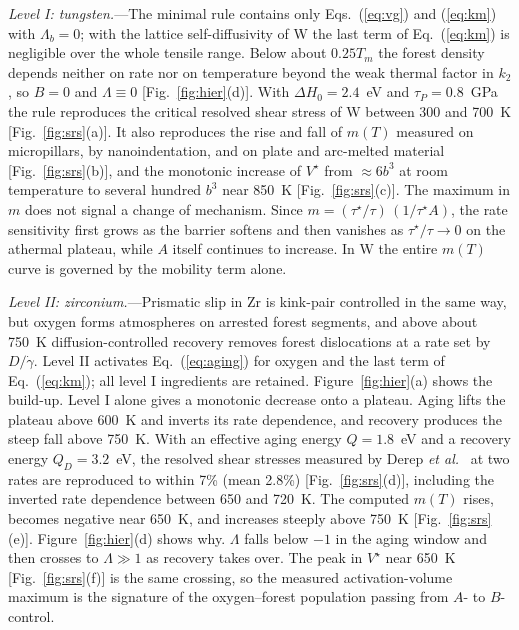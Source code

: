 \documentclass[aps,prl,twocolumn,superscriptaddress,amsmath,amssymb,floatfix]{revtex4-2}
\newcommand{\gd}{\dot\gamma}
\newcommand{\ts}{\tau^{\star}}
\begin{document}
\textit{Level I: tungsten.}---The minimal rule contains only Eqs.~(\ref{eq:vg}) and (\ref{eq:km}) with $\Lambda_b=0$; with the lattice self-diffusivity of W the last term of Eq.~(\ref{eq:km}) is negligible over the whole tensile range. Below about $0.25T_m$ the forest density depends neither on rate nor on temperature beyond the weak thermal factor in $k_2$, so $B=0$ and $\Lambda\equiv0$ [Fig.~\ref{fig:hier}(d)]. With $\Delta H_0=2.4$~eV and $\tau_P=0.8$~GPa the rule reproduces the critical resolved shear stress of W between 300 and 700~K [Fig.~\ref{fig:srs}(a)]. It also reproduces the rise and fall of $m(T)$ measured on micropillars, by nanoindentation, and on plate and arc-melted material [Fig.~\ref{fig:srs}(b)], and the monotonic increase of $V^\star$ from $\approx6b^3$ at room temperature to several hundred $b^3$ near 850~K [Fig.~\ref{fig:srs}(c)]. The maximum in $m$ does not signal a change of mechanism. Since $m=(\ts/\tau)\,(1/\ts A)$, the rate sensitivity first grows as the barrier softens and then vanishes as $\ts/\tau\to0$ on the athermal plateau, while $A$ itself continues to increase. In W the entire $m(T)$ curve is governed by the mobility term alone.

\textit{Level II: zirconium.}---Prismatic slip in Zr is kink-pair controlled in the same way, but oxygen forms atmospheres on arrested forest segments, and above about 750~K diffusion-controlled recovery removes forest dislocations at a rate set by $D/\gd$. Level II activates Eq.~(\ref{eq:aging}) for oxygen and the last term of Eq.~(\ref{eq:km}); all level I ingredients are retained. Figure~\ref{fig:hier}(a) shows the build-up. Level I alone gives a monotonic decrease onto a plateau. Aging lifts the plateau above 600~K and inverts its rate dependence, and recovery produces the steep fall above 750~K. With an effective aging energy $Q=1.8$~eV and a recovery energy $Q_D=3.2$~eV, the resolved shear stresses measured by Derep \emph{et al.}~\cite{Derep} at two rates are reproduced to within 7\% (mean 2.8\%) [Fig.~\ref{fig:srs}(d)], including the inverted rate dependence between 650 and 720~K. The computed $m(T)$ rises, becomes negative near 650~K, and increases steeply above 750~K [Fig.~\ref{fig:srs}(e)]. Figure~\ref{fig:hier}(d) shows why. $\Lambda$ falls below $-1$ in the aging window and then crosses to $\Lambda\gg1$ as recovery takes over. The peak in $V^\star$ near 650~K [Fig.~\ref{fig:srs}(f)] is the same crossing, so the measured activation-volume maximum is the signature of the oxygen--forest population passing from $A$- to $B$-control.
\end{document}
